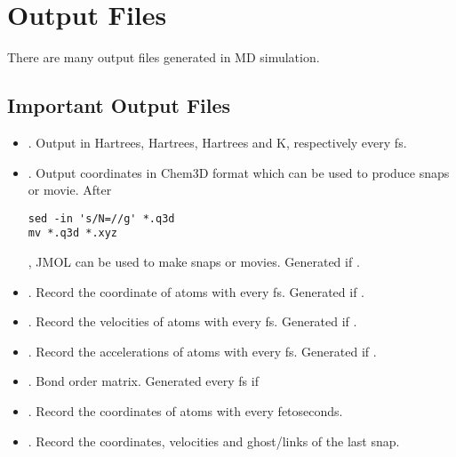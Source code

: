 \documentclass[11pt]{JHEP3}
\begin{document}

\section{Output Files}
There are many output files generated in MD simulation.

\subsection{Important Output Files}
\begin{itemize}
\item {}. Output  in Hartrees, Hartrees, Hartrees and K, respectively every
 fs.

\item {}. Output coordinates in Chem3D format which can be used to produce snaps or
movie. After
\begin{lstlisting}
sed -in 's/N=//g' *.q3d                                            
mv *.q3d *.xyz
\end{lstlisting}
, JMOL can be used to make snaps or movies. Generated if 
.

\item {}. Record the coordinate of atoms with
 every  fs. Generated if
.

\item {}. Record the velocities of atoms with
 every  fs. Generated if
.

\item {}. Record the accelerations of atoms with
 every  fs. Generated if
.

\item {}. Bond order matrix. Generated every  fs if

\item {}. Record the coordinates of atoms with 
every  fetoseconds.

\item {}. Record the coordinates, velocities and
ghost/links of the last snap.
\end{itemize}
\end{document}
